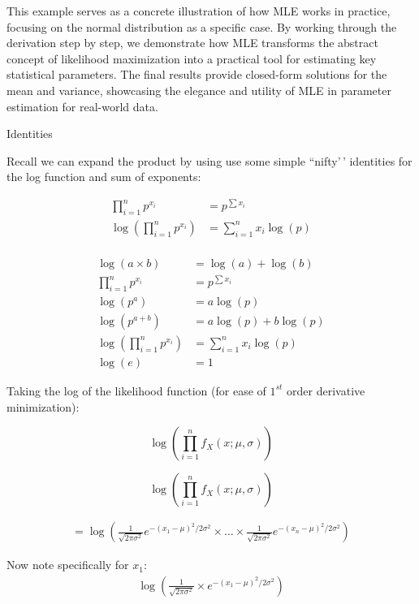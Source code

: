 \documentclass[
  12 pt,
  a4paper,
]{book}
\numberwithin{equation}{section}
\theoremstyle{plain}      %
\theoremstyle{definition} %
\theoremstyle{remark}     %
\theoremstyle{note}         %
\begin{document}
This example serves as a concrete illustration of how MLE works in
practice, focusing on the normal distribution as a specific case. By
working through the derivation step by step, we demonstrate how MLE
transforms the abstract concept of likelihood maximization into a
practical tool for estimating key statistical parameters. The final
results provide closed-form solutions for the mean and variance,
showcasing the elegance and utility of MLE in parameter estimation for
real-world data.

Identities

Recall we can expand the product by using use some simple ``nifty'\,'
identities for the log function and sum of exponents:

\[
\begin{aligned}
\prod_{i=1}^{n} p^{x_{i}}&=p^{\sum x_{i}} \\
\log \left(\prod_{i=1}^{n} p^{x_{i}}\right)&=\sum_{i=1}^{n} x_{i} \log (p)\\ 
\end{aligned}
\]

\[
\begin{aligned}
\log(a \times b) &= \log(a) + \log(b)\\
\prod_{i=1}^{n} p^{x_{i}}&=p^{\sum x_{i}} \\
\log \left(p^{a}\right)&=a \log (p) \\
\log \left(p^{a+b}\right)&=a \log (p)+b \log (p) \\
\log \left(\prod_{i=1}^{n} p^{x_{i}}\right)&=\sum_{i=1}^{n} x_{i} \log (p)\\ 
\log (e) &= 1
\end{aligned}
\]

Taking the log of the likelihood function (for ease of \(1^{st}\) order
derivative minimization):

\begin{equation}
\log ( \prod_{i=1}^{n} f_{X}(x ; \mu, \sigma))
\end{equation}

\[
\log ( \prod_{i=1}^{n} f_{X}(x ; \mu, \sigma))
\]

\begin{align}
=\log \left(\frac{1}{\sqrt{2 \pi \sigma^{2}}} e^{-\left(x_{1}-\mu\right)^{2} / 2 \sigma^{2}} \times \ldots \times \frac{1}{\sqrt{2 \pi \sigma^{2}}} e^{-\left(x_{n}-\mu\right)^{2} / 2 \sigma^{2}}\right)
\end{align}

Now note specifically for \(x_{1}\): \begin{align}
\log \left(\frac{1}{\sqrt{2 \pi \sigma^{2}}} \times e^{-\left(x_{1}-\mu\right)^{2} / 2 \sigma^{2}}\right)
\end{align}
\end{document}

